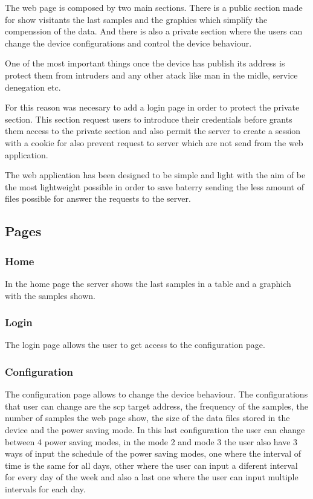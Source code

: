 	The web page is composed by two main sections. There is a public section made for show visitants the last samples and the graphics which simplify the compenssion of the data. And there is also a private section where the users can change the device configurations and control the device behaviour.

	One of the most important things once the device has publish its address is protect them from intruders and any other atack like man in the midle, service denegation etc.

	For this reason was necesary to add a login page in order to protect the private section. This section request users to introduce their credentials before grants them access to the private section and also permit the server to create a session with a cookie for also prevent request to server which are not send from the web application.

	The web application has been designed to be simple and light with the aim of be the most lightweight possible in order to save baterry sending the less amount of files possible for answer the requests to the server.

		\subsection{Pages} %
		\subsubsection{Home}
		In the home page the server shows the last samples in a table and a graphich with the samples shown.
		
		\subsubsection{Login}
		The login page allows the user to get access to the configuration page.

		\subsubsection{Configuration} %
		The configuration page allows to change the device behaviour. The configurations that user can change are the scp target address, the frequency of the samples, the number of samples the web page show, the size of the data files stored in the device and the power saving mode. In this last configuration the user can change between 4 power saving modes, in the mode 2 and mode 3 the user also have 3 ways of input the schedule of the power saving modes, one where the interval of time is the same for all days, other where the user can input a diferent interval for every day of the week and also a last one where the user can input multiple intervals for each day.

